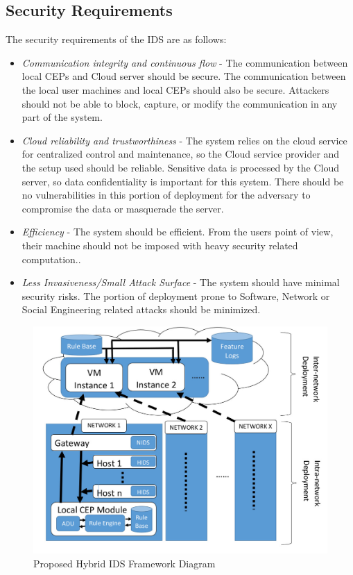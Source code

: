 \documentclass[conference]{sig-alternate-05-2015}
\begin{document}
\subsection{Security Requirements}
The security requirements of the IDS are as follows:
\begin{itemize}
\item \textit{Communication integrity and continuous flow} - The communication between local CEPs and Cloud server should be secure. The communication between the local user machines and local CEPs should also be secure. Attackers should not be able to block, capture, or modify the communication in any part of the system. 
\item \textit{Cloud reliability and trustworthiness} - The system relies on the cloud service for centralized control and maintenance, so the Cloud service provider and the setup used should be reliable. Sensitive data is processed by the Cloud server, so data confidentiality is important for this system. There should be no vulnerabilities in this portion of deployment for the adversary to compromise the data or masquerade the server.  
\item \textit{Efficiency} - The system should be efficient. From the users point of view, their machine should not be imposed with heavy security related computation.. 
\item \textit{Less Invasiveness/Small Attack Surface} - The system should have minimal security risks. The portion of deployment prone to Software, Network or Social Engineering related attacks should be minimized. 
\end{itemize}

\begin{figure}[t]
\caption{Proposed Hybrid IDS Framework Diagram}
\includegraphics[width=\textwidth]{framework}
\centering
\end{figure}
\end{document}

